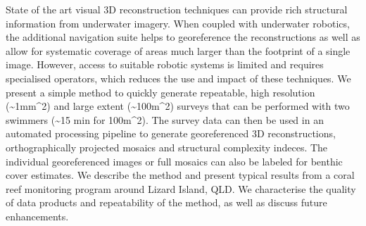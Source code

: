 
State of the art visual 3D reconstruction techniques can provide rich structural information from underwater imagery. When coupled with underwater robotics, the additional navigation suite helps to georeference the reconstructions as well as allow for systematic coverage of areas much larger than the footprint of a single image. However, access to suitable robotic systems is limited and requires specialised operators, which reduces the use and impact of these techniques.
We present a simple method to quickly generate repeatable, high resolution (\sim{1mm^{2}}) and large extent (\sim{100m^{2}}) surveys that can be performed with two swimmers (\sim{15 min} for {100m^{2}}). The survey data can then be used in an automated processing pipeline to generate georeferenced 3D reconstructions, orthographically projected mosaics and structural complexity indeces. The individual georeferenced images or full mosaics can also be labeled for benthic cover estimates.
We describe the method and present typical results from a coral reef monitoring program around Lizard Island, QLD. We characterise the quality of data products and repeatability of the method, as well as discuss future enhancements.
  
  